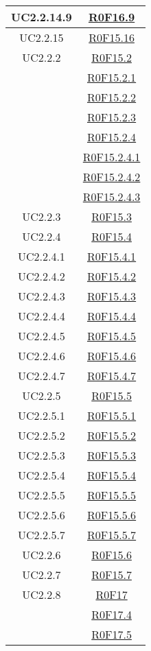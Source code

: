 \documentclass[../AnalisiDeiRequisiti.tex]{subfiles}
\begin{document}
\begin{longtable}{|c|c|}
	UC2.2.14.9 & \hyperlink{R0F16.9}{R0F16.9}\\\hline
	UC2.2.15 & \hyperlink{R0F15.16}{R0F15.16}\\\hline
	UC2.2.2 & \hyperlink{R0F15.2}{R0F15.2}\\& \hyperlink{R0F15.2.1}{R0F15.2.1}\\& \hyperlink{R0F15.2.2}{R0F15.2.2}\\& \hyperlink{R0F15.2.3}{R0F15.2.3}\\& \hyperlink{R0F15.2.4}{R0F15.2.4}\\& \hyperlink{R0F15.2.4.1}{R0F15.2.4.1}\\& \hyperlink{R0F15.2.4.2}{R0F15.2.4.2}\\& \hyperlink{R0F15.2.4.3}{R0F15.2.4.3}\\\hline
	UC2.2.3 & \hyperlink{R0F15.3}{R0F15.3}\\\hline
	UC2.2.4 & \hyperlink{R0F15.4}{R0F15.4}\\\hline
	UC2.2.4.1 & \hyperlink{R0F15.4.1}{R0F15.4.1}\\\hline
	UC2.2.4.2 & \hyperlink{R0F15.4.2}{R0F15.4.2}\\\hline
	UC2.2.4.3 & \hyperlink{R0F15.4.3}{R0F15.4.3}\\\hline
	UC2.2.4.4 & \hyperlink{R0F15.4.4}{R0F15.4.4}\\\hline
	UC2.2.4.5 & \hyperlink{R0F15.4.5}{R0F15.4.5}\\\hline
	UC2.2.4.6 & \hyperlink{R0F15.4.6}{R0F15.4.6}\\\hline
	UC2.2.4.7 & \hyperlink{R0F15.4.7}{R0F15.4.7}\\\hline
	UC2.2.5 & \hyperlink{R0F15.5}{R0F15.5}\\\hline
	UC2.2.5.1 & \hyperlink{R0F15.5.1}{R0F15.5.1}\\\hline
	UC2.2.5.2 & \hyperlink{R0F15.5.2}{R0F15.5.2}\\\hline
	UC2.2.5.3 & \hyperlink{R0F15.5.3}{R0F15.5.3}\\\hline
	UC2.2.5.4 & \hyperlink{R0F15.5.4}{R0F15.5.4}\\\hline
	UC2.2.5.5 & \hyperlink{R0F15.5.5}{R0F15.5.5}\\\hline
	UC2.2.5.6 & \hyperlink{R0F15.5.6}{R0F15.5.6}\\\hline
	UC2.2.5.7 & \hyperlink{R0F15.5.7}{R0F15.5.7}\\\hline
	UC2.2.6 & \hyperlink{R0F15.6}{R0F15.6}\\\hline
	UC2.2.7 & \hyperlink{R0F15.7}{R0F15.7}\\\hline
	UC2.2.8 & \hyperlink{R0F17}{R0F17}\\& \hyperlink{R0F17.4}{R0F17.4}\\& \hyperlink{R0F17.5}{R0F17.5}\\\hline

\end{longtable}
\end{document}
